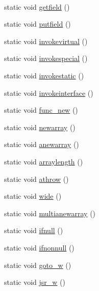 \begin{DoxyCompactItemize}
$$\item 
static void \hyperlink{classOperations_a0bb399fe0f64dc21699132c092560e19}{getfield} ()
\item 
static void \hyperlink{classOperations_a56385f246d3d4d5c5674c988a1f0e658}{putfield} ()
\item 
static void \hyperlink{classOperations_acf53d7e184b8828702b4d5036ef0a7a9}{invokevirtual} ()
\item 
static void \hyperlink{classOperations_ab561e27c8450ceec7e4f8b0a155fcda3}{invokespecial} ()
\item 
static void \hyperlink{classOperations_a562d8c9cc5975de2ee6d1a95e1969724}{invokestatic} ()
\item 
static void \hyperlink{classOperations_a9206595fad5d3ac24514b2dfd6a013da}{invokeinterface} ()
\item 
static void \hyperlink{classOperations_a7594e147407e1f4ede57229899fd17d6}{func\+\_\+new} ()
\item 
static void \hyperlink{classOperations_a3537f097b63240202ac0c9249dda33a9}{newarray} ()
\item 
static void \hyperlink{classOperations_aa5110e66aa565e9130be292935ef5c71}{anewarray} ()
\item 
static void \hyperlink{classOperations_ae01c8bce2d6a583151dc0e46d1b8d52f}{arraylength} ()
\item 
static void \hyperlink{classOperations_a2a5eea0fb18391bb3854dfe55c8ac5d3}{athrow} ()
\item 
static void \hyperlink{classOperations_ab1474dfc4eb5142361b00d185f0a4a2b}{wide} ()
\item 
static void \hyperlink{classOperations_a78c45edfcdf63668974ffc3b2d84a309}{multianewarray} ()
\item 
static void \hyperlink{classOperations_a030f5995f8f357254e543d0cbce2d189}{ifnull} ()
\item 
static void \hyperlink{classOperations_a00af7ab198690f5d3e6c7f2b2d374194}{ifnonnull} ()
\item 
static void \hyperlink{classOperations_aed8436ead5dfcaef69b24e1b2fff7744}{goto\+\_\+w} ()
\item 
static void \hyperlink{classOperations_a22241dabd3678c4ab77bbe5882c3a4db}{jsr\+\_\+w} ()
\end{DoxyCompactItemize}
